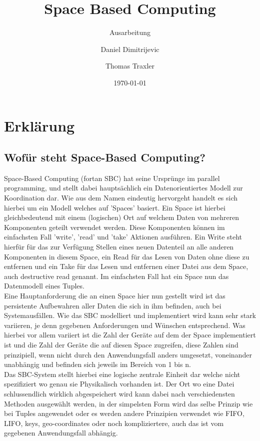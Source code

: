\documentclass[a4paper,12pt]{scrreprt}
\begin{document}
\author{Daniel Dimitrijevic \and Thomas Traxler} %
\title{ Space Based Computing } %
\subject{VSDB} %
\subtitle{ Ausarbeitung } %
\date{\today} %
\publishers{5AHITT} %

\maketitle
\tableofcontents



\chapter{Erklärung}
	\section{Wofür steht Space-Based Computing?}
		Space-Based Computing (fortan SBC) hat seine Ursprünge im parallel programming, und stellt dabei hauptsächlich ein Datenorientiertes Modell zur Koordination dar. Wie aus dem Namen eindeutig hervorgeht handelt es sich hierbei um ein Modell welches auf 'Spaces' basiert. Ein Space ist hierbei gleichbedeutend mit einem (logischen) Ort auf welchem Daten von mehreren Komponenten geteilt verwendet werden. Diese Komponenten können im einfachsten Fall 'write', 'read' und 'take' Aktionen ausführen. Ein Write steht hierfür für das zur Verfügung Stellen eines neuen Datenteil an alle anderen Komponenten in diesem Space, ein Read für das Lesen von Daten ohne diese zu entfernen und ein Take für das Lesen und entfernen einer Datei aus dem Space, auch destructive read genannt. Im einfachsten Fall hat ein Space nun das Datenmodell eines Tuples.\\      Eine Hauptanforderung die an einen Space hier nun gestellt wird ist das persistente Aufbewahren aller Daten die sich in ihm befinden, auch bei Systemausfällen. Wie das SBC modelliert und implementiert wird kann sehr stark variieren, je denn gegebenen Anforderungen und Wünschen entsprechend. Was hierbei vor allem variiert ist die Zahl der Geräte auf dem der Space implementiert ist und die Zahl der Geräte die auf diesen Space zugreifen, diese Zahlen sind prinzipiell, wenn nicht durch den Anwendungsfall anders umgesetzt, voneinander unabhängig und befinden sich jeweils im Bereich von 1 bis n. \\   Das SBC-System stellt hierbei eine logische zentrale Einheit dar welche nicht spezifiziert wo genau sie Physikalisch vorhanden ist. Der Ort wo eine Datei schlussendlich wirklich abgespeichert wird kann dabei nach verschiedensten Methoden ausgewählt werden, in der simpelsten Form wird das selbe Prinzip wie bei Tuples angewendet %
		oder es werden andere Prinzipien verwendet wie FIFO, LIFO, keys, geo-coordinates oder noch kompliziertere, auch das ist vom gegebenen Anwendungsfall abhängig.
\end{document}
